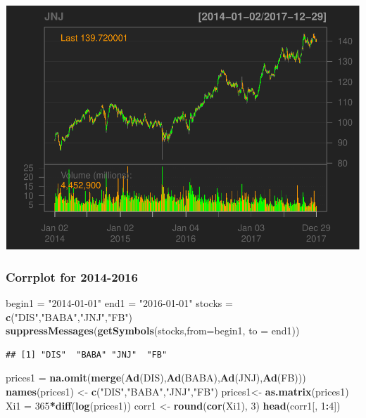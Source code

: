 \documentclass[]{article}
\newenvironment{Shaded}{\begin{snugshade}}{\end{snugshade}}
\newcommand{\KeywordTok}[1]{\textcolor[rgb]{0.13,0.29,0.53}{\textbf{#1}}}
\newcommand{\DataTypeTok}[1]{\textcolor[rgb]{0.13,0.29,0.53}{#1}}
\newcommand{\DecValTok}[1]{\textcolor[rgb]{0.00,0.00,0.81}{#1}}
\newcommand{\StringTok}[1]{\textcolor[rgb]{0.31,0.60,0.02}{#1}}
\newcommand{\OperatorTok}[1]{\textcolor[rgb]{0.81,0.36,0.00}{\textbf{#1}}}
\newcommand{\NormalTok}[1]{#1}
\begin{document}
\includegraphics{Markowitz_Research_Me_files/figure-latex/unnamed-chunk-4-4.pdf}

\subsubsection{Corrplot for 2014-2016}\label{corrplot-for-2014-2016}

\begin{Shaded}
\begin{Highlighting}[]
\NormalTok{begin1 =}\StringTok{ "2014-01-01"}
\NormalTok{end1 =}\StringTok{ "2016-01-01"}
\NormalTok{stocks =}\StringTok{ }\KeywordTok{c}\NormalTok{(}\StringTok{"DIS"}\NormalTok{,}\StringTok{"BABA"}\NormalTok{,}\StringTok{"JNJ"}\NormalTok{,}\StringTok{"FB"}\NormalTok{)}
\KeywordTok{suppressMessages}\NormalTok{(}\KeywordTok{getSymbols}\NormalTok{(stocks,}\DataTypeTok{from=}\NormalTok{begin1, }\DataTypeTok{to =}\NormalTok{ end1))}
\end{Highlighting}
\end{Shaded}

\begin{verbatim}
## [1] "DIS"  "BABA" "JNJ"  "FB"
\end{verbatim}

\begin{Shaded}
\begin{Highlighting}[]
\NormalTok{prices1 =}\StringTok{ }\KeywordTok{na.omit}\NormalTok{(}\KeywordTok{merge}\NormalTok{(}\KeywordTok{Ad}\NormalTok{(DIS),}\KeywordTok{Ad}\NormalTok{(BABA),}\KeywordTok{Ad}\NormalTok{(JNJ),}\KeywordTok{Ad}\NormalTok{(FB)))}
\KeywordTok{names}\NormalTok{(prices1) <-}\StringTok{ }\KeywordTok{c}\NormalTok{(}\StringTok{"DIS"}\NormalTok{,}\StringTok{"BABA"}\NormalTok{,}\StringTok{"JNJ"}\NormalTok{,}\StringTok{"FB"}\NormalTok{)}
\NormalTok{prices1<-}\StringTok{ }\KeywordTok{as.matrix}\NormalTok{(prices1)}
\NormalTok{Xi1 =}\StringTok{ }\DecValTok{365}\OperatorTok{*}\KeywordTok{diff}\NormalTok{(}\KeywordTok{log}\NormalTok{(prices1))}
\NormalTok{corr1 <-}\StringTok{ }\KeywordTok{round}\NormalTok{(}\KeywordTok{cor}\NormalTok{(Xi1), }\DecValTok{3}\NormalTok{)}
\KeywordTok{head}\NormalTok{(corr1[, }\DecValTok{1}\OperatorTok{:}\DecValTok{4}\NormalTok{])}
\end{Highlighting}
\end{Shaded}
\end{document}
